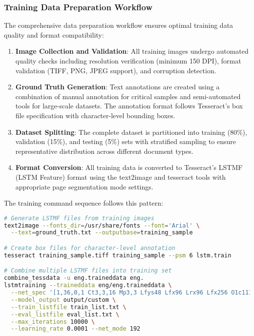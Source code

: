 \subsubsection{Training Data Preparation Workflow}

The comprehensive data preparation workflow ensures optimal training data quality and format compatibility:

\begin{enumerate}
\item \textbf{Image Collection and Validation}: All training images undergo automated quality checks including resolution verification (minimum 150 DPI), format validation (TIFF, PNG, JPEG support), and corruption detection.

\item \textbf{Ground Truth Generation}: Text annotations are created using a combination of manual annotation for critical samples and semi-automated tools for large-scale datasets. The annotation format follows Tesseract's box file specification with character-level bounding boxes.

\item \textbf{Dataset Splitting}: The complete dataset is partitioned into training (80\%), validation (15\%), and testing (5\%) sets with stratified sampling to ensure representative distribution across different document types.

\item \textbf{Format Conversion}: All training data is converted to Tesseract's LSTMF (LSTM Feature) format using the text2image and tesseract tools with appropriate page segmentation mode settings.
\end{enumerate}

The training command sequence follows this pattern:

\begin{lstlisting}[language=bash,basicstyle=\footnotesize\ttfamily,frame=single,breaklines=true,columns=flexible,showspaces=false,showstringspaces=false]
# Generate LSTMF files from training images
text2image --fonts_dir=/usr/share/fonts --font='Arial' \
  --text=ground_truth.txt --outputbase=training_sample

# Create box files for character-level annotation
tesseract training_sample.tiff training_sample --psm 6 lstm.train

# Combine multiple LSTMF files into training set
combine_tessdata -u eng.traineddata eng.
lstmtraining --traineddata eng/eng.traineddata \
  --net_spec '[1,36,0,1 Ct3,3,16 Mp3,3 Lfys48 Lfx96 Lrx96 Lfx256 O1c111]' \
  --model_output output/custom \
  --train_listfile train_list.txt \
  --eval_listfile eval_list.txt \
  --max_iterations 10000 \
  --learning_rate 0.0001 --net_mode 192
\end{lstlisting}

